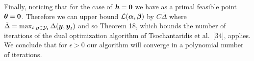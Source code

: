 \documentclass[10pt,journal,letterpaper,compsoc]{IEEEtran}
\numberwithin{equation}{section}
\begin{document}
Finally, noticing that for the case of ${\boldsymbol{h}} = \textbf{0}$ we have as a
primal feasible point $\boldsymbol{\theta} = \textbf{0}$.  Therefore we can upper
bound $\Ell(\balpha, \bbeta)$ by $C \bar{\Delta}$ where $\bar{\Delta}
= \max_{t,\by \in \Y_t} \Delta(\by, \by_t)$ and so Theorem 18, which
bounds the number of iterations of the dual optimization algorithm of
Tsochantaridis et al.~[34], applies. We conclude that for
$\epsilon > 0$ our algorithm will converge in a polynomial number of
iterations.
\end{document}
